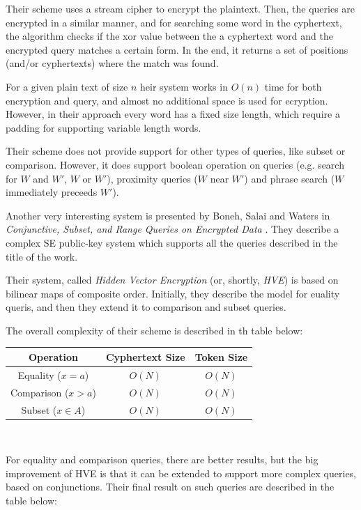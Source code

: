 \documentclass[a4paper, 12pt, oneside]{article}
\begin{document}
	Their scheme uses a stream cipher to encrypt the plaintext. Then, the queries are encrypted in a similar manner, and for searching some word in the cyphertext, the algorithm checks if the xor value between the a cyphertext word and the	encrypted query matches a certain form. In the end, it returns a set of positions (and/or cyphertexts) where the match was found. 
	
	For a given plain text of size $n$ heir system works in $O(n)$ time for both encryption and query, and almost no additional space is used for ecryption. However, in their approach every word has a fixed size length, which require a padding for supporting variable length words. 
	
	Their scheme does not provide support for other types of queries, like subset or comparison. However, it does support boolean operation on queries (e.g. search for $W$ and $W'$, $W$ or $W'$), proximity queries ($W$ near $W'$) and phrase search ($W$ immediately preceeds $W'$).


\bigskip
Another very interesting system is presented by Boneh, Salai and Waters in \textit{Conjunctive, Subset, and Range Queries on Encrypted Data} \cite{bowa}. They describe a complex SE public-key system which supports all the queries described in the title of the work.

	Their system, called \textit{Hidden Vector Encryption} (or, shortly, \textit{HVE}) is based on bilinear maps of composite order. Initially, they describe the model for euality queris, and then they extend it to comparison and subset queries. 
	
	The overall complexity of their scheme is described in th table below:
\begin{center}
 \begin{tabular}{|c|c|c|} 
 \hline
  Operation & Cyphertext Size & Token Size \\ [0.5ex] 
 \hline\hline
 Equality ($x = a$) & $O(N)$ & $O(N)$ \\ 
 \hline
 Comparison ($x > a$) & $O(N)$ & $O(N)$\\ [1ex] 
 \hline
 Subset ($x \in A$) & $O(N)$ & $O(N)$\\ [1ex] 
 \hline
\end{tabular}
\\
\end{center}

For equality and comparison queries, there are better results, but the big improvement of HVE is that it can be extended to support more complex queries, based on conjunctions. Their final result on such queries are described in the table below:
\end{document}
